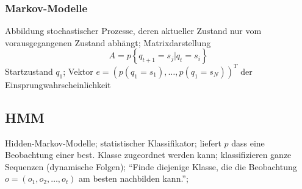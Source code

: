 \documentclass[german,color,6pt]{latex4ei/latex4ei_sheet}
\begin{document}
\begin{sectionbox}
\subsubsection{Markov-Modelle}
Abbildung stochastischer Prozesse, deren aktueller Zustand nur vom vorausgegangenen Zustand abhängt; Matrixdarstellung \begin{equation*}
A = p \left\{ q_{t+1} = s_j | q_t = s_i \right\}
\end{equation*}
Startzustand $q_1$; Vektor $e = (p(q_1 = s_1), \dots , p(q_1 = s_N))^T$ der Einsprungwahrscheinlichkeit
\end{sectionbox}

\subsection{HMM}

\begin{sectionbox}
Hidden-Markov-Modelle; statistischer Klassifikator; liefert $p$ dass eine Beobachtung einer best. Klasse zugeordnet werden kann; klassifizieren ganze Sequenzen (dynamische Folgen); "`Finde diejenige Klasse, die die Beobachtung $o=(o_1, o_2, \dots , o_t)$ am besten nachbilden kann."';
\end{sectionbox}
\end{document}

